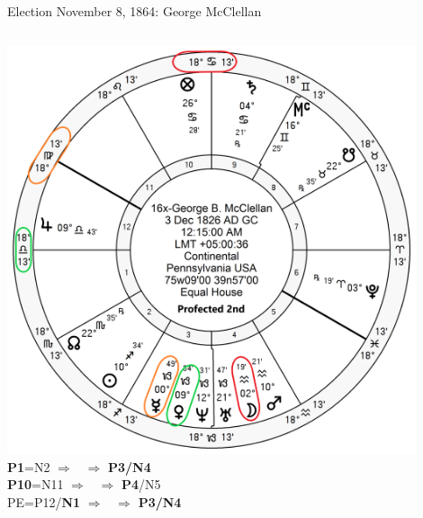 \begin{frame}[t]{Election November 8, 1864: George McClellan}
\begin{columns}[T, onlytextwidth]
\vspace{-1em}
{\includegraphics[width=0.9\textwidth]{charts/McClellan-Prof-2nd.png}}
\textbf{\dgreen P1}=N2 $\Rightarrow$ \Venus\, $\Rightarrow$ \textbf{\dgreen P3/N4}\\
\textbf{\red P10}=N11 $\Rightarrow$ \Moon\, $\Rightarrow$ \textbf{\dgreen P4}/N5\\
PE=P12/\textbf{\dgreen N1} $\Rightarrow$ \Mercury\, $\Rightarrow$ \textbf{\dgreen P3/N4}

\end{columns}
\end{frame}
